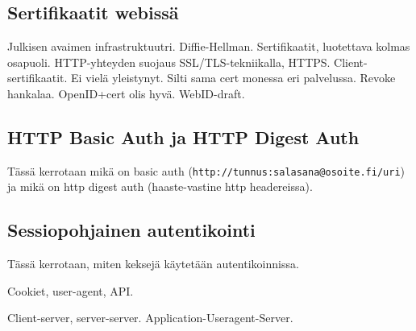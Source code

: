 \documentclass[finnish,gradu]{tktltiki}
\begin{document}




  \subsection{Sertifikaatit webissä} %
  \label{sub:sertifikaatit_webissä}
  Julkisen avaimen infrastruktuutri.
  Diffie-Hellman.
  Sertifikaatit, luotettava kolmas osapuoli.
  HTTP-yhteyden suojaus SSL/TLS-tekniikalla, HTTPS.
  Client-sertifikaatit. Ei vielä yleistynyt. Silti sama cert monessa eri palvelussa. Revoke hankalaa. OpenID+cert olis hyvä.
  WebID-draft.


  \subsection{HTTP Basic Auth ja HTTP Digest Auth} %
  \label{sub:http_basic_auth_ja_http_digest_auth}
  Tässä kerrotaan mikä on basic auth (\verb!http://tunnus:salasana@osoite.fi/uri!) ja mikä on http digest auth (haaste-vastine http headereissa).



  \subsection{Sessiopohjainen autentikointi} %
  \label{sub:sessiopohjainen_autentikointi}
  Tässä kerrotaan, miten keksejä käytetään autentikoinnissa.

  Cookiet, user-agent, API.

  Client-server, server-server. Application-Useragent-Server.
\end{document}
